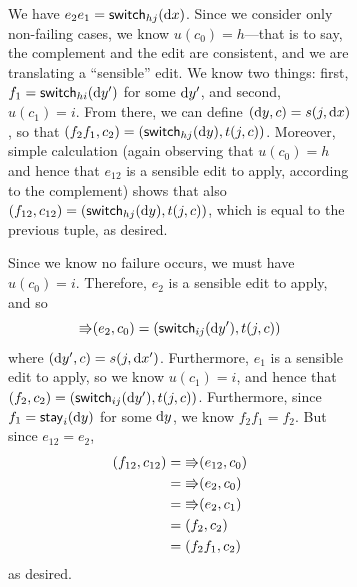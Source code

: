 \begin{figure}
\begin{figure}
\begin{pf}
\begin{trivlist}
 We have
            $e_2e_1=\mathsf{switch}_{hj}(\textrm{d} x)$. Since we consider only non-failing
            cases, we know $u(c_0)=h$---that is to say, the complement and the
            edit are consistent, and
            we are translating a ``sensible'' edit. We know two
            things: first, $f_1 = \mathsf{switch}_{hi}(\textrm{d} y')$ for some $\textrm{d} y'$, and
            second, $u(c_1)=i$. From there, we can define
            $(\textrm{d} y,c) = s(j,\textrm{d} x)$, 
            so that
            $(f_2f_1,c_2) = (\mathsf{switch}_{hj}(\textrm{d} y),t(j,c))$.
            Moreover, simple calculation (again observing that $u(c_0)=h$
            and hence that $e_{12}$ is a sensible edit to apply, according
            to the complement) shows that also
            $(f_{12},c_{12}) = (\mathsf{switch}_{hj}(\textrm{d} y),t(j,c))$,
            which is equal to the previous tuple, as desired.

 Since we know no
            failure occurs, we must have $u(c_0)=i$.
            Therefore, $e_2$ is a sensible edit to apply, and so
            \[\mathord{\Rrightarrow}(e_2,c_0) = (\mathsf{switch}_{ij}(\textrm{d} y'),t(j,c))\]
            where $(\textrm{d} y',c)=s(j,\textrm{d} x')$. Furthermore, $e_1$ is a sensible
            edit to apply, so we know $u(c_1)=i$, and hence that $(f_2,c_2)
            = (\mathsf{switch}_{ij}(\textrm{d} y'),t(j,c))$. Furthermore, since $f_1 =
            \mathsf{stay}_i(\textrm{d} y)$ for some $\textrm{d} y$, we know $f_2f_1=f_2$. But since
            $e_{12}=e_2$,
            \begin{align*}
                (f_{12},c_{12}) &= \mathord{\Rrightarrow}(e_{12},c_0) \\
                &= \mathord{\Rrightarrow}(e_2,c_0) \\
                &= \mathord{\Rrightarrow}(e_2,c_1) \\
                &= (f_2,c_2) \\
                &= (f_2f_1,c_2)
            \end{align*}
            as desired.


\end{trivlist}
\end{pf}
\end{figure}
\end{figure}
